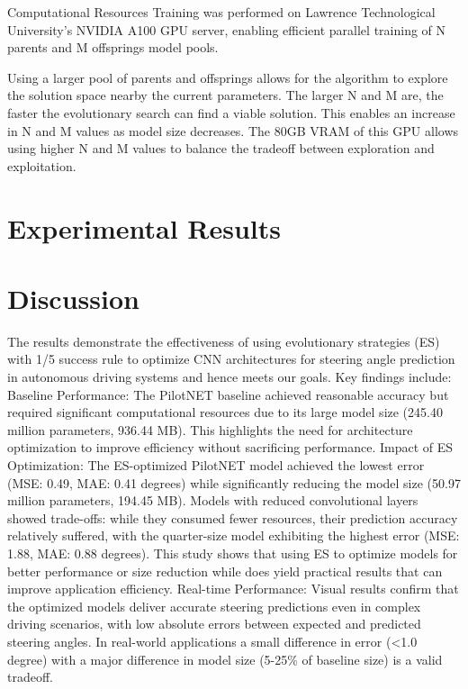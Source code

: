 \documentclass[conference]{IEEEtran}
\begin{document}
Computational Resources
Training was performed on Lawrence Technological University’s NVIDIA A100 GPU server, enabling efficient parallel training of N parents and M offsprings model pools. 

Using a larger pool of parents and offsprings allows for the algorithm to explore the solution space nearby the current parameters. The larger N and M are, the faster the evolutionary search can find a viable solution. This enables an increase in N and M values as model size decreases. The 80GB VRAM of this GPU allows using higher N and M values to balance the tradeoff between exploration and exploitation.


\section{Experimental Results}

\section{Discussion}
The results demonstrate the effectiveness of using evolutionary strategies (ES) with 1/5 success rule to optimize CNN architectures for steering angle prediction in autonomous driving systems and hence meets our goals. Key findings include:
Baseline Performance: The PilotNET baseline achieved reasonable accuracy but required significant computational resources due to its large model size (245.40 million parameters, 936.44 MB).
This highlights the need for architecture optimization to improve efficiency without sacrificing performance.
Impact of ES Optimization: The ES-optimized PilotNET model achieved the lowest error (MSE: 0.49, MAE: 0.41 degrees) while significantly reducing the model size (50.97 million parameters, 194.45 MB). Models with reduced convolutional layers showed trade-offs: while they consumed fewer resources, their prediction accuracy relatively suffered, with the quarter-size model exhibiting the highest error (MSE: 1.88, MAE: 0.88 degrees). This study shows that using ES to optimize models for better performance or size reduction while does yield practical results that can improve application efficiency.
Real-time Performance: Visual results confirm that the optimized models deliver accurate steering predictions even in complex driving scenarios, with low absolute errors between expected and predicted steering angles. In real-world applications a small difference in error (<1.0 degree) with a major difference in model size (5-25\% of baseline size) is a valid tradeoff.
\end{document}
